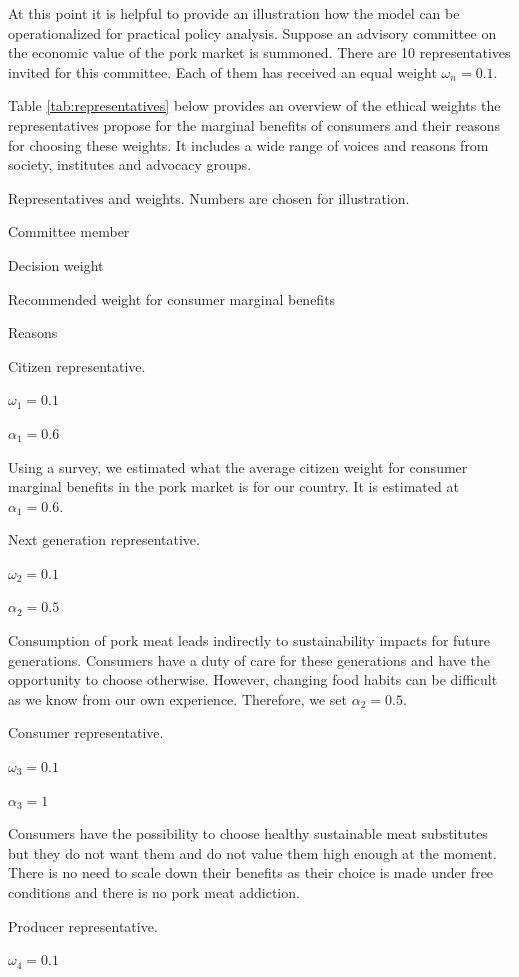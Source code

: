 \documentclass[
]{book}
\begin{document}
At this point it is helpful to provide an illustration how the model can be operationalized for practical policy analysis. Suppose an advisory committee on the economic value of the pork market is summoned. There are 10 representatives invited for this committee. Each of them has received an equal weight \(\omega_n=0.1\).

Table \ref{tab:representatives} below provides an overview of the ethical weights the representatives propose for the marginal benefits of consumers and their reasons for choosing these weights. It includes a wide range of voices and reasons from society, institutes and advocacy groups.

\label{tab:representatives}Representatives and weights. Numbers are chosen for illustration.

Committee member

Decision weight

Recommended weight for consumer marginal benefits

Reasons

Citizen representative.

\(\omega_1 = 0.1\)

\(\alpha_1 = 0.6\)

Using a survey, we estimated what the average citizen weight for consumer marginal benefits in the pork market is for our country. It is estimated at \(\alpha_1=0.6\).

Next generation representative.

\(\omega_2 = 0.1\)

\(\alpha_2 = 0.5\)

Consumption of pork meat leads indirectly to sustainability impacts for future generations. Consumers have a duty of care for these generations and have the opportunity to choose otherwise. However, changing food habits can be difficult as we know from our own experience. Therefore, we set \(\alpha_2=0.5\).

Consumer representative.

\(\omega_3 = 0.1\)

\(\alpha_3 = 1\)

Consumers have the possibility to choose healthy sustainable meat substitutes but they do not want them and do not value them high enough at the moment. There is no need to scale down their benefits as their choice is made under free conditions and there is no pork meat addiction.

Producer representative.

\(\omega_4 = 0.1\)
\end{document}
